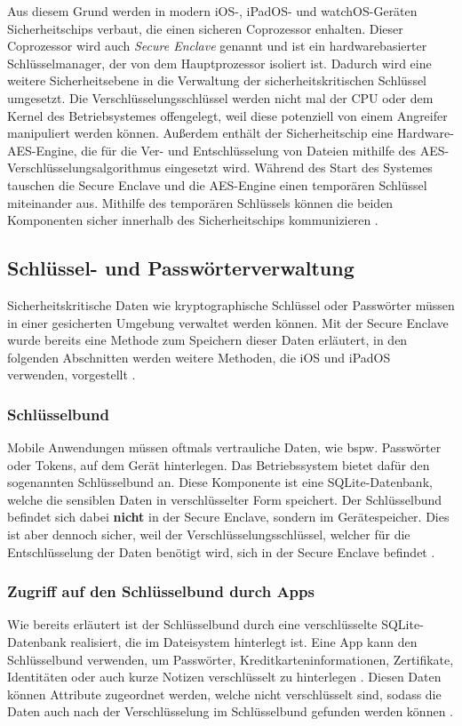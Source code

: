 Aus diesem Grund werden in modern iOS-, iPadOS- und watchOS-Geräten Sicherheitschips verbaut, die einen sicheren
Coprozessor enhalten. Dieser Coprozessor wird auch \textit{Secure Enclave} genannt und ist ein hardwarebasierter 
Schlüsselmanager, der von dem Hauptprozessor isoliert ist. Dadurch wird eine weitere Sicherheitsebene in die 
Verwaltung der sicherheitskritischen Schlüssel umgesetzt. Die Verschlüsselungsschlüssel werden nicht mal
der CPU oder dem Kernel des Betriebsystemes offengelegt, weil diese potenziell von einem Angreifer manipuliert
werden können. Außerdem enthält der Sicherheitschip eine Hardware-AES-Engine, die für die Ver- und Entschlüsselung
von Dateien mithilfe des AES-Verschlüsselungsalgorithmus eingesetzt wird. Während des Start des Systemes tauschen
die Secure Enclave und die AES-Engine einen temporären Schlüssel miteinander aus. Mithilfe des temporären Schlüssels
können die beiden Komponenten sicher innerhalb des Sicherheitschips
kommunizieren \cite{apple2020hardware_security,apple2020}.

\subsection{Schlüssel- und Passwörterverwaltung}
Sicherheitskritische Daten wie kryptographische Schlüssel oder Passwörter müssen in einer gesicherten Umgebung
verwaltet werden können. Mit der Secure Enclave wurde bereits eine Methode zum Speichern dieser Daten erläutert, 
in den folgenden Abschnitten werden weitere Methoden, die iOS und iPadOS
verwenden, vorgestellt \cite{apple2020}.

\subsubsection{Schlüsselbund}
Mobile Anwendungen müssen oftmals vertrauliche Daten, wie bspw. Passwörter oder Tokens, auf dem Gerät hinterlegen. 
Das Betriebssystem bietet dafür den sogenannten Schlüsselbund an. Diese Komponente ist eine SQLite-Datenbank,
welche die sensiblen Daten in verschlüsselter Form speichert. Der Schlüsselbund befindet sich dabei \textbf{nicht} in der
Secure Enclave, sondern im Gerätespeicher. Dies ist aber dennoch sicher, weil der Verschlüsselungsschlüssel, welcher
für die Entschlüsselung der Daten benötigt wird, sich in der Secure Enclave
befindet \cite{apple2020}.

\subsubsection{Zugriff auf den Schlüsselbund durch Apps}
Wie bereits erläutert ist der Schlüsselbund durch eine verschlüsselte
SQLite-Datenbank realisiert, die im Dateisystem hinterlegt ist. Eine App kann
den Schlüsselbund verwenden, um Passwörter, Kreditkarteninformationen,
Zertifikate, Identitäten oder auch kurze Notizen verschlüsselt zu hinterlegen
\cite{apple2020keychain_services}.  Diesen Daten können Attribute zugeordnet
werden, welche nicht verschlüsselt sind, sodass die Daten auch nach der
Verschlüsselung im Schlüsselbund gefunden werden können
\cite{apple2020keychain_items}. 

